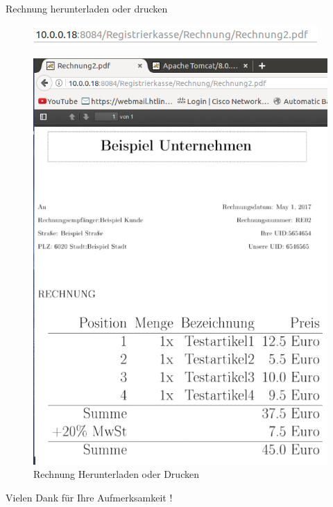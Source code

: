 \documentclass[12pt]{beamer}
\begin{document}
\begin{frame}
	Rechnung herunterladen oder drucken
	\begin{figure}
		\includegraphics[scale=0.5]{Bilder/URL2.png}
\end{figure}		
	
	\begin{figure}
		\includegraphics[scale=0.2]{Bilder/rechnung.png}
		\caption{Rechnung Herunterladen oder Drucken }
\end{figure}		
	
\end{frame}


\begin{frame}
	\begin{Large}
		\begin{center}
				Vielen Dank für Ihre Aufmerksamkeit !
		\end{center}
	\end{Large}
\end{frame}
\end{document}
